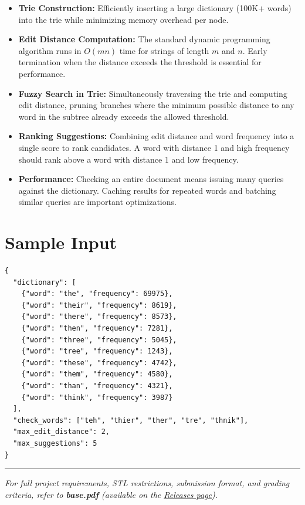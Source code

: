 \begin{itemize}
  \item \textbf{Trie Construction:} Efficiently inserting a large dictionary (100K+ words) into the trie while minimizing memory overhead per node.
  \item \textbf{Edit Distance Computation:} The standard dynamic programming algorithm runs in $O(mn)$ time for strings of length $m$ and $n$. Early termination when the distance exceeds the threshold is essential for performance.
  \item \textbf{Fuzzy Search in Trie:} Simultaneously traversing the trie and computing edit distance, pruning branches where the minimum possible distance to any word in the subtree already exceeds the allowed threshold.
  \item \textbf{Ranking Suggestions:} Combining edit distance and word frequency into a single score to rank candidates. A word with distance 1 and high frequency should rank above a word with distance 1 and low frequency.
  \item \textbf{Performance:} Checking an entire document means issuing many queries against the dictionary. Caching results for repeated words and batching similar queries are important optimizations.
\end{itemize}

\section{Sample Input}

\begin{lstlisting}[style=json, caption={data/input\_sample.json}]
{
  "dictionary": [
    {"word": "the", "frequency": 69975},
    {"word": "their", "frequency": 8619},
    {"word": "there", "frequency": 8573},
    {"word": "then", "frequency": 7281},
    {"word": "three", "frequency": 5045},
    {"word": "tree", "frequency": 1243},
    {"word": "these", "frequency": 4742},
    {"word": "them", "frequency": 4580},
    {"word": "than", "frequency": 4321},
    {"word": "think", "frequency": 3987}
  ],
  "check_words": ["teh", "thier", "ther", "tre", "thnik"],
  "max_edit_distance": 2,
  "max_suggestions": 5
}
\end{lstlisting}

\vfill
\noindent\rule{\textwidth}{0.4pt}
{\small\textit{For full project requirements, STL restrictions, submission format, and grading criteria, refer to \textbf{base.pdf} (available on the \href{https://github.com/BestSithInEU/cse211-term-projects/releases}{Releases page}).}}
